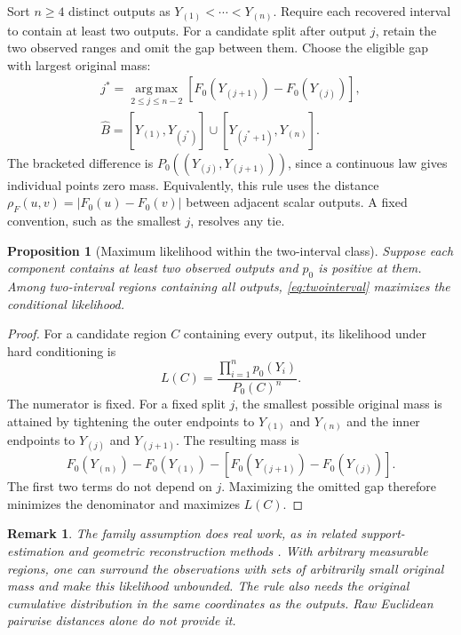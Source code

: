 \documentclass[10pt,letterpaper]{article}
\theoremstyle{typed}
\newtheorem{proposition}[lemma]{Proposition}
\newtheorem{remark}[lemma]{Remark}
\begin{document}
Sort $n\geq4$ distinct outputs as $Y_{(1)}<\cdots<Y_{(n)}$. Require each recovered interval to contain at least two outputs. For a candidate split after output $j$, retain the two observed ranges and omit the gap between them. Choose the eligible gap with largest original mass:
\begin{equation}
  \begin{gathered}
  j^*=\operatorname*{arg\,max}_{2\leq j\leq n-2}
  \left[F_0(Y_{(j+1)})-F_0(Y_{(j)})\right],\\
  \widehat B=[Y_{(1)},Y_{(j^*)}]\cup[Y_{(j^*+1)},Y_{(n)}].
  \end{gathered}
  \label{eq:twointerval}
\end{equation}
The bracketed difference is $P_0((Y_{(j)},Y_{(j+1)}))$, since a continuous law gives individual points zero mass. Equivalently, this rule uses the distance $\rho_F(u,v)=|F_0(u)-F_0(v)|$ between adjacent scalar outputs. A fixed convention, such as the smallest $j$, resolves any tie.

\begin{proposition}[Maximum likelihood within the two-interval class]
Suppose each component contains at least two observed outputs and $p_0$ is positive at them. Among two-interval regions containing all outputs, \eqref{eq:twointerval} maximizes the conditional likelihood.
\end{proposition}
\begin{proof}
For a candidate region $C$ containing every output, its likelihood under hard conditioning is
\[
  L(C)=\frac{\prod_{i=1}^{n}p_0(Y_i)}{P_0(C)^n}.
\]
The numerator is fixed. For a fixed split $j$, the smallest possible original mass is attained by tightening the outer endpoints to $Y_{(1)}$ and $Y_{(n)}$ and the inner endpoints to $Y_{(j)}$ and $Y_{(j+1)}$. The resulting mass is
\[
 F_0(Y_{(n)})-F_0(Y_{(1)})
 -\left[F_0(Y_{(j+1)})-F_0(Y_{(j)})\right].
\]
The first two terms do not depend on $j$. Maximizing the omitted gap therefore minimizes the denominator and maximizes $L(C)$.
\end{proof}

\begin{remark}
The family assumption does real work, as in related support-estimation and geometric reconstruction methods \cite{cuevas1997,chazal2009}. With arbitrary measurable regions, one can surround the observations with sets of arbitrarily small original mass and make this likelihood unbounded. The rule also needs the original cumulative distribution in the same coordinates as the outputs. Raw Euclidean pairwise distances alone do not provide it.
\end{remark}
\end{document}
